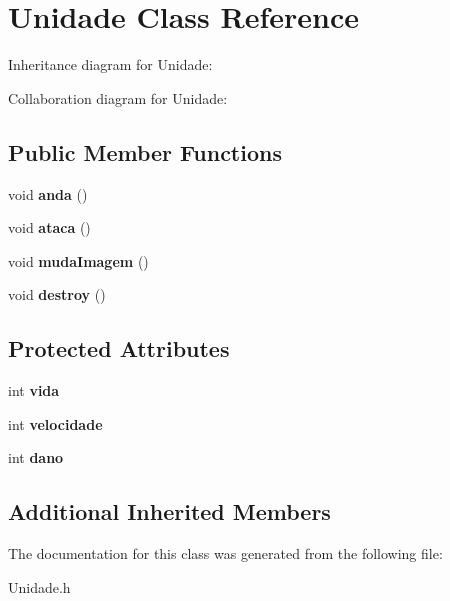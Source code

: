 \hypertarget{classUnidade}{}\section{Unidade Class Reference}
\label{classUnidade}


Inheritance diagram for Unidade\+:


Collaboration diagram for Unidade\+:
\subsection*{Public Member Functions}
\begin{DoxyCompactItemize}
\item 
void {\bfseries anda} ()\hypertarget{classUnidade_a14bf59836ff4de0567299a741e02bdc9}{}\label{classUnidade_a14bf59836ff4de0567299a741e02bdc9}

\item 
void {\bfseries ataca} ()\hypertarget{classUnidade_a7fab2bd6431f1bf152cd1bf9b843da68}{}\label{classUnidade_a7fab2bd6431f1bf152cd1bf9b843da68}

\item 
void {\bfseries muda\+Imagem} ()\hypertarget{classUnidade_aa637230315c462760a3ff76f8e73642f}{}\label{classUnidade_aa637230315c462760a3ff76f8e73642f}

\item 
void {\bfseries destroy} ()\hypertarget{classUnidade_abb789587a0ef08b232fec69beb69914d}{}\label{classUnidade_abb789587a0ef08b232fec69beb69914d}

\end{DoxyCompactItemize}
\subsection*{Protected Attributes}
\begin{DoxyCompactItemize}
\item 
int {\bfseries vida}\hypertarget{classUnidade_ade279c89874823ab6619912a9effdb30}{}\label{classUnidade_ade279c89874823ab6619912a9effdb30}

\item 
int {\bfseries velocidade}\hypertarget{classUnidade_ad3dfaaa4ab0811e34bbae9ffd5690006}{}\label{classUnidade_ad3dfaaa4ab0811e34bbae9ffd5690006}

\item 
int {\bfseries dano}\hypertarget{classUnidade_a5d9c008ab781955a737fb0e354a103df}{}\label{classUnidade_a5d9c008ab781955a737fb0e354a103df}

\end{DoxyCompactItemize}
\subsection*{Additional Inherited Members}


The documentation for this class was generated from the following file\+:\begin{DoxyCompactItemize}
\item 
Unidade.\+h\end{DoxyCompactItemize}
